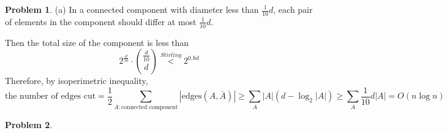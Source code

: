\documentclass[a4paper]{article}
\theoremstyle{definition}
\newtheorem{problem}{Problem}
\theoremstyle{plain}
\newcommand{\<}{\left<}
\renewcommand{\>}{\right>}
\numberwithin{equation}{problem}
\begin{document}
\begin{problem}
    (a) In a connected component with diameter less than  $ \frac{1}{10}d $, each pair of elements in the component should differ at most  $ \frac{1}{10}d $.
    
    Then the total size of the component is less than 
    \[2^\frac{d}{10}\cdot\binom{\frac{d}{10}}{d}\overset{Stirling}{<}2^{0.8d}\]
    Therefore, by isoperimetric inequality, 
    \[\text{the number of edges cut}=\frac{1}{2}\sum_{A:\text{connected component}}|\mathrm{edges}(A,\bar{A})| \geq\sum_A |A|(d-\log_2|A|) \geq \sum_A\frac{1}{10}d|A|=O(n\log n)\]

\end{problem}
\begin{problem}
    
\end{problem}
\end{document}
